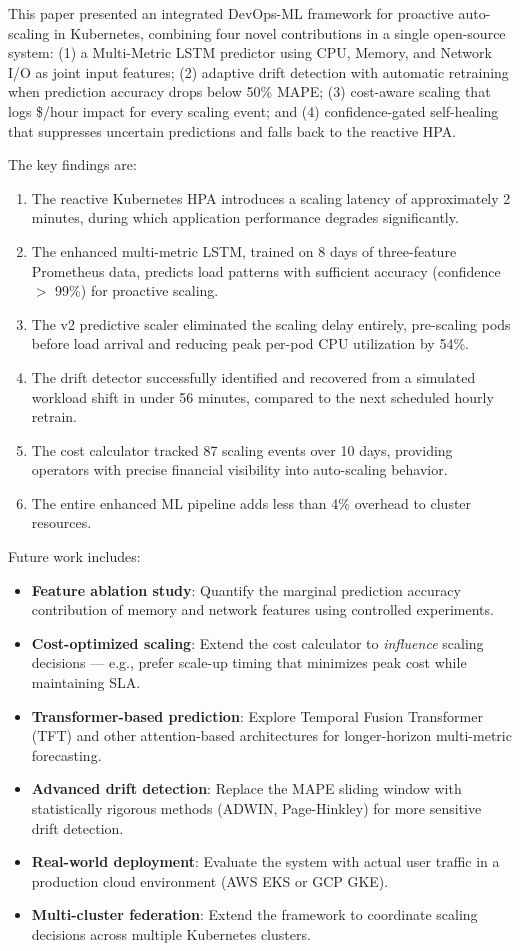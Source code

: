 \documentclass[journal]{IEEEtran}
\begin{document}
This paper presented an integrated DevOps-ML framework for proactive auto-scaling in Kubernetes, combining four novel contributions in a single open-source system: (1) a Multi-Metric LSTM predictor using CPU, Memory, and Network I/O as joint input features; (2) adaptive drift detection with automatic retraining when prediction accuracy drops below 50\% MAPE; (3) cost-aware scaling that logs \$/hour impact for every scaling event; and (4) confidence-gated self-healing that suppresses uncertain predictions and falls back to the reactive HPA.

The key findings are:
\begin{enumerate}
    \item The reactive Kubernetes HPA introduces a scaling latency of approximately 2 minutes, during which application performance degrades significantly.
    \item The enhanced multi-metric LSTM, trained on 8 days of three-feature Prometheus data, predicts load patterns with sufficient accuracy (confidence $>$ 99\%) for proactive scaling.
    \item The v2 predictive scaler eliminated the scaling delay entirely, pre-scaling pods before load arrival and reducing peak per-pod CPU utilization by 54\%.
    \item The drift detector successfully identified and recovered from a simulated workload shift in under 56 minutes, compared to the next scheduled hourly retrain.
    \item The cost calculator tracked 87 scaling events over 10 days, providing operators with precise financial visibility into auto-scaling behavior.
    \item The entire enhanced ML pipeline adds less than 4\% overhead to cluster resources.
\end{enumerate}

Future work includes:
\begin{itemize}
    \item \textbf{Feature ablation study}: Quantify the marginal prediction accuracy contribution of memory and network features using controlled experiments.
    \item \textbf{Cost-optimized scaling}: Extend the cost calculator to \textit{influence} scaling decisions --- e.g., prefer scale-up timing that minimizes peak cost while maintaining SLA.
    \item \textbf{Transformer-based prediction}: Explore Temporal Fusion Transformer (TFT) and other attention-based architectures for longer-horizon multi-metric forecasting.
    \item \textbf{Advanced drift detection}: Replace the MAPE sliding window with statistically rigorous methods (ADWIN, Page-Hinkley) for more sensitive drift detection.
    \item \textbf{Real-world deployment}: Evaluate the system with actual user traffic in a production cloud environment (AWS EKS or GCP GKE).
    \item \textbf{Multi-cluster federation}: Extend the framework to coordinate scaling decisions across multiple Kubernetes clusters.
\end{itemize}
\end{document}
